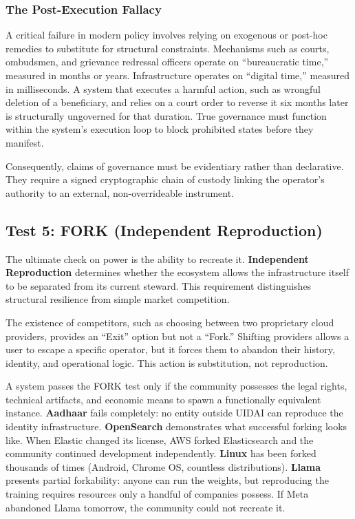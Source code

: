 \subsubsection{The Post-Execution Fallacy}
A critical failure in modern policy involves relying on exogenous or post-hoc remedies to substitute for structural constraints. Mechanisms such as courts, ombudsmen, and grievance redressal officers operate on ``bureaucratic time,'' measured in months or years. Infrastructure operates on ``digital time,'' measured in milliseconds. A system that executes a harmful action, such as wrongful deletion of a beneficiary, and relies on a court order to reverse it six months later is structurally ungoverned for that duration. True governance must function within the system's execution loop to block prohibited states before they manifest.

Consequently, claims of governance must be evidentiary rather than declarative. They require a signed cryptographic chain of custody linking the operator's authority to an external, non-overrideable instrument.

\subsection{Test 5: FORK (Independent Reproduction)}

The ultimate check on power is the ability to recreate it. \textbf{Independent Reproduction} determines whether the ecosystem allows the infrastructure itself to be separated from its current steward. This requirement distinguishes structural resilience from simple market competition.

The existence of competitors, such as choosing between two proprietary cloud providers, provides an ``Exit'' option but not a ``Fork.'' Shifting providers allows a user to escape a specific operator, but it forces them to abandon their history, identity, and operational logic. This action is substitution, not reproduction.

A system passes the FORK test only if the community possesses the legal rights, technical artifacts, and economic means to spawn a functionally equivalent instance. \textbf{Aadhaar} fails completely: no entity outside UIDAI can reproduce the identity infrastructure. \textbf{OpenSearch} demonstrates what successful forking looks like. When Elastic changed its license, AWS forked Elasticsearch and the community continued development independently. \textbf{Linux} has been forked thousands of times (Android, Chrome OS, countless distributions). \textbf{Llama} presents partial forkability: anyone can run the weights, but reproducing the training requires resources only a handful of companies possess. If Meta abandoned Llama tomorrow, the community could not recreate it.

